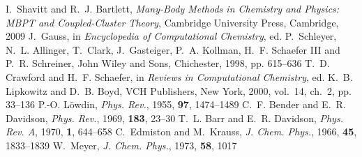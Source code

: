\documentclass[11pt,article]{achemso}
\begin{document}
\begin{mcitethebibliography}{41}
I.~Shavitt and R.~J. Bartlett, \emph{Many-Body Methods in Chemistry and
  Physics: MBPT and Coupled-Cluster Theory}, Cambridge University Press,
  Cambridge, 2009\relax
\mciteBstWouldAddEndPuncttrue
\mciteSetBstMidEndSepPunct{\mcitedefaultmidpunct}
{\mcitedefaultendpunct}{\mcitedefaultseppunct}\relax
\EndOfBibitem
{}
J.~Gauss, in \emph{Encyclopedia of Computational Chemistry}, ed. P.~Schleyer,
  N.~L. Allinger, T.~Clark, J.~Gasteiger, P.~A. Kollman, H.~F. {Schaefer III}
  and P.~R. Schreiner, John Wiley and Sons, Chichester, 1998, pp.
  615--636\relax
\mciteBstWouldAddEndPuncttrue
\mciteSetBstMidEndSepPunct{\mcitedefaultmidpunct}
{\mcitedefaultendpunct}{\mcitedefaultseppunct}\relax
\EndOfBibitem
{}
T.~D. Crawford and H.~F. Schaefer, in \emph{Reviews in Computational
  Chemistry}, ed. K.~B. Lipkowitz and D.~B. Boyd, VCH Publishers, New York,
  2000, vol.~14, ch.~2, pp. 33--136\relax
\mciteBstWouldAddEndPuncttrue
\mciteSetBstMidEndSepPunct{\mcitedefaultmidpunct}
{\mcitedefaultendpunct}{\mcitedefaultseppunct}\relax
\EndOfBibitem
{}
P.-O. L{\"o}wdin, \emph{Phys. Rev.}, 1955, \textbf{97}, 1474--1489\relax
\mciteBstWouldAddEndPuncttrue
\mciteSetBstMidEndSepPunct{\mcitedefaultmidpunct}
{\mcitedefaultendpunct}{\mcitedefaultseppunct}\relax
\EndOfBibitem
{}
C.~F. Bender and E.~R. Davidson, \emph{Phys. Rev.}, 1969, \textbf{183},
  23--30\relax
\mciteBstWouldAddEndPuncttrue
\mciteSetBstMidEndSepPunct{\mcitedefaultmidpunct}
{\mcitedefaultendpunct}{\mcitedefaultseppunct}\relax
\EndOfBibitem
{}
T.~L. Barr and E.~R. Davidson, \emph{Phys. Rev. A}, 1970, \textbf{1},
  644--658\relax
\mciteBstWouldAddEndPuncttrue
\mciteSetBstMidEndSepPunct{\mcitedefaultmidpunct}
{\mcitedefaultendpunct}{\mcitedefaultseppunct}\relax
\EndOfBibitem
{}
C.~Edmiston and M.~Krauss, \emph{J. Chem. Phys.}, 1966, \textbf{45},
  1833--1839\relax
\mciteBstWouldAddEndPuncttrue
\mciteSetBstMidEndSepPunct{\mcitedefaultmidpunct}
{\mcitedefaultendpunct}{\mcitedefaultseppunct}\relax
\EndOfBibitem
{}
W.~Meyer, \emph{J. Chem. Phys.}, 1973, \textbf{58}, 1017\relax
\mciteBstWouldAddEndPuncttrue
\mciteSetBstMidEndSepPunct{\mcitedefaultmidpunct}
{\mcitedefaultendpunct}{\mcitedefaultseppunct}\relax
\EndOfBibitem
{}

\end{mcitethebibliography}
\end{document}
